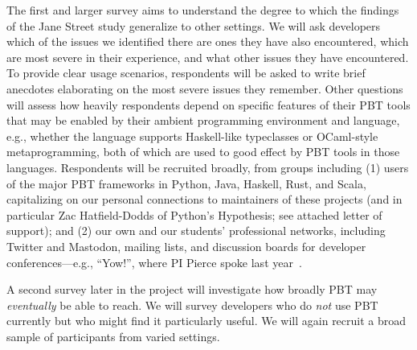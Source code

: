 The first and larger survey
aims to understand the degree to which
the findings of the Jane Street study generalize to other settings.
We will
ask developers which of the issues we identified there are
ones they have also encountered, which are most severe
in their experience, and what
other issues they have encountered.
To provide
clear usage scenarios, respondents will
be asked to write brief anecdotes elaborating on the
most severe issues they remember.  Other questions will assess how
heavily respondents depend on specific features of their PBT tools
that may be enabled by their
ambient programming environment and language, e.g., whether the
language supports Haskell-like typeclasses or OCaml-style
metaprogramming, both of which are used to good effect by
PBT tools in those languages.
Respondents will
be recruited broadly, from groups including
(1)
users of the major PBT frameworks in Python, Java, Haskell, Rust, and
Scala, capitalizing on our personal connections to maintainers of
these projects (and in particular Zac Hatfield-Dodds of Python's Hypothesis; see attached letter of support); and
(2) our own and our students' professional networks, including
Twitter and Mastodon, mailing lists, and discussion boards for developer
conferences---e.g., ``Yow!'', where PI Pierce spoke last
year~\cite{Pierce:Yow22}.

A second survey later in the project will investigate
how broadly PBT may {\em eventually} be able to reach.  We will
survey developers who do {\em not} use PBT
currently but who might find it particularly useful.
We will again recruit a broad sample of participants from varied settings.


%



